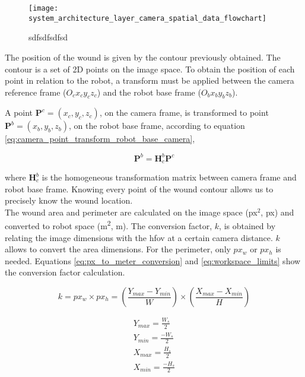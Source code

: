 \begin{figure}[htbp]
	\centering
	\texttt{[image: system\_architecture\_layer\_camera\_spatial\_data\_flowchart]}
	\caption{sdfsdfsdfsd}
	\label{fig:system_architecture_layer_camera_spatial_data_flowchart}
\end{figure}

The position of the wound is given by the contour previously obtained. The contour is a set of 2D points on the image space. To obtain the position of each point in relation to the robot, a transform must be applied between the camera reference frame ($O_cx_cy_cz_c$) and the robot base frame ($O_bx_by_bz_b$).

A point $\boldsymbol{P}^c = (x_c, y_c, z_c)$, on the camera frame, is transformed to point $\boldsymbol{P}^b = (x_b, y_b, z_b)$, on the robot base frame, according to equation \ref{eq:camera_point_transform_robot_base_camera},

\begin{equation}
\boldsymbol{P}^b = \boldsymbol{H}^b_c \boldsymbol{P}^c
\label{eq:camera_point_transform_robot_base_camera}
\end{equation}

where $\boldsymbol{H}^b_c$ is the homogeneous transformation matrix between camera frame and robot base frame. Knowing every point of the wound contour allows us to precisely know the wound location.\\

The wound area and perimeter are calculated on the image space (px$^2$, px) and converted to robot space (\si{\meter \squared}, \si{\meter}). The conversion factor, $k$, is obtained by relating the image dimensions with the \gls{hfov} at a certain camera distance. $k$ allows to convert the area dimensions. For the perimeter, only $px_w$ or $px_h$ is needed. Equations \ref{eq:px_to_meter_conversion} and \ref{eq:workspace_limits} show the conversion factor calculation.

\begin{equation}
k = px_w \times px_h = (\frac{Y_{max} - Y_{min}}{W}) \times (\frac{X_{max} - X_{min}}{H})
\label{eq:px_to_meter_conversion}
\end{equation}

\begin{equation}
\label{eq:workspace_limits}
    \left.
    \begin{aligned}
        Y_{max} = \frac{W_s}{2} \\
        Y_{min} = \frac{-W_s}{2} \\
        X_{max} = \frac{H_s}{2} \\
        X_{min} = \frac{-H_s}{2} \\
    \end{aligned}
    \right.
\end{equation}

